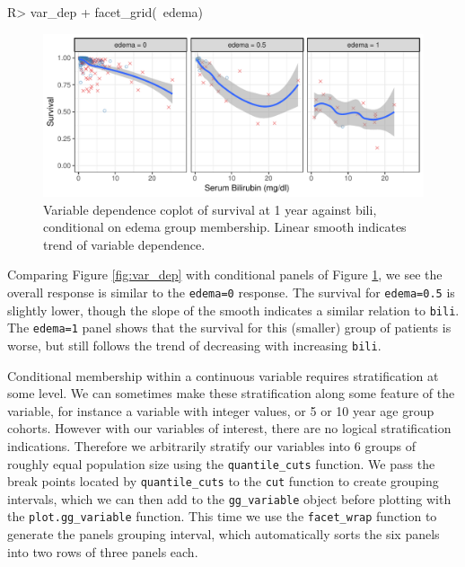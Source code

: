 \documentclass[article]{jss}
\begin{document}
\begin{Schunk}
\begin{Sinput}
R> var_dep + facet_grid(~edema)
\end{Sinput}
\begin{figure}[!htb]

{\centering \includegraphics{fig-rfs/rfs-coplot_bilirubin-1} 

}

\caption[Variable dependence coplot of survival at 1 year against bili, conditional on edema group membership]{Variable dependence coplot of survival at 1 year against bili, conditional on edema group membership. Linear smooth indicates trend of variable dependence.}\label{fig:coplot_bilirubin}
\end{figure}
\end{Schunk}

Comparing Figure \ref{fig:var_dep} with conditional panels of Figure
\ref{fig:coplot_bilirubin}, we see the overall response is similar to
the \texttt{edema=0} response. The survival for \texttt{edema=0.5} is
slightly lower, though the slope of the smooth indicates a similar
relation to \texttt{bili}. The \texttt{edema=1} panel shows that the
survival for this (smaller) group of patients is worse, but still
follows the trend of decreasing with increasing \texttt{bili}.

Conditional membership within a continuous variable requires
stratification at some level. We can sometimes make these stratification
along some feature of the variable, for instance a variable with integer
values, or 5 or 10 year age group cohorts. However with our variables of
interest, there are no logical stratification indications. Therefore we
arbitrarily stratify our variables into 6 groups of roughly equal
population size using the \texttt{quantile\_cuts} function. We pass the
break points located by \texttt{quantile\_cuts} to the \texttt{cut}
function to create grouping intervals, which we can then add to the
\texttt{gg\_variable} object before plotting with the
\texttt{plot.gg\_variable} function. This time we use the
\texttt{facet\_wrap} function to generate the panels grouping interval,
which automatically sorts the six panels into two rows of three panels
each.
\end{document}
